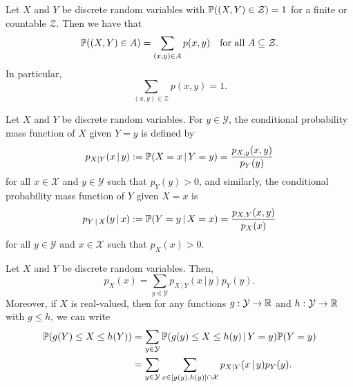 \documentclass[10pt, a4paper]{article}
\begin{document}
\begin{theorem}\label{pre_prop_thm_discretevarcountsumeqone}
    Let $X$ and $Y$ be discrete random variables with $\P((X, Y) \in \mathcal{Z}) = 1$ for a finite or countable $\mathcal{Z}$.
    Then we have that
    \[
    \P((X, Y) \in A) = \sum_{(x, y) \in A}p(x, y)\quad\text{for all } A \subseteq \mathcal{Z}.
    \]
    In particular,
    \[
    \sum_{(x, y) \in \mathcal{Z}}p(x, y) = 1.
    \]
\end{theorem}

\begin{definition}
    Let $X$ and $Y$ be discrete random variables.
    For $y \in \mathcal{Y}$,
    the conditional probability mass function of $X$ given $Y = y$ is defined by
    \[
    p_{X | Y}(x\,|\,y) := \P(X = x\,|\, Y = y) = \frac{p_{X, y}(x, y)}{p_{Y}(y)}
    \]
    for all $x \in \mathcal{X}$ and $y \in \mathcal{Y}$ such that $p_Y(y) > 0$,
    and similarly,
    the conditional probability mass function of $Y$ given $X = x$ is
    \[
    p_{Y\,|\,X}(y\,|\,x) := \P(Y = y\,|\,X = x) = \frac{p_{X, Y}(x, y)}{p_X(x)}
    \]
    for all $y \in \mathcal{Y}$ and $x \in \mathcal{X}$ such that $p_X(x) > 0$.
\end{definition}

\begin{theorem}
    Let $X$ and $Y$ be discrete random variables.
    Then,
    \[
    p_X(x) = \sum_{y \in \mathcal{Y}}p_{X\,|\,Y}(x\,|\,y)p_Y(y).
    \]
    Moreover,
    if $X$ is real-valued,
    then for any functions $g : \mathcal{Y} \rightarrow \R$ and $h : \mathcal{Y} \rightarrow \R$ with $g \leq h$,
    we can write
    \begin{align*}
        \P(g(Y) \leq X \leq h(Y)) &= \sum_{y \in \mathcal{Y}}\P(g(y) \leq X \leq h(y)\,|\, Y = y)\P(Y = y) \\
        &= \sum_{y \in \mathcal{Y}}\sum_{x \in [g(y), h(y)] \cap \mathcal{X}}p_{X|Y}(x\,|\,y)p_Y(y).
    \end{align*}
\end{theorem}
\end{document}
